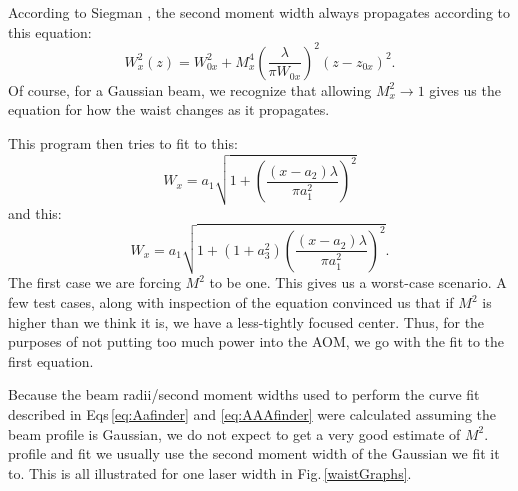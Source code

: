 According to Siegman \cite{SiegmanBeamQuality}, the second moment width always propagates according to this equation: 
\begin{equation}
W_x^2(z)=W_{0x}^2 + M_x^4 \left( \frac{\lambda}{\pi W_{0x}}\right)^2 (z-z_{0x})^2. 
\end{equation}
Of course, for a Gaussian beam, we recognize that allowing $M_x^2\rightarrow 1$ gives us the equation for how the waist changes as it propagates. 

This program then tries to fit to this:
\begin{equation}
W_x=a_1 \sqrt{1+\left(\frac{(x-a_2) \lambda}{\pi a_1^2}\right)^2}\label{eq:Aafinder}
\end{equation}
and this:
\begin{equation}
W_x=a_1 \sqrt{1+(1+a_3^2) \left(\frac{(x-a_2) \lambda}{\pi a_1^2}\right)^2}.\label{eq:AAAfinder} 
\end{equation}
The first case we are forcing $M^2$ to be one. This gives us a worst-case scenario. A few test cases, along with inspection of the equation convinced us that if $M^2$ is higher than we think it is, we have a less-tightly focused center. Thus, for the purposes of not putting too much power into the AOM, we go with the fit to the first equation. 

Because the beam radii/second moment widths used to perform the curve fit described in Eqs\,\ref{eq:Aafinder} and \ref{eq:AAAfinder} were calculated assuming the beam profile is Gaussian, we do not expect to get a very good estimate of $M^2$.  profile and fit we usually use the second moment width of the Gaussian we fit it to. This is all illustrated for one laser width in Fig.\,\ref{waistGraphs}.

